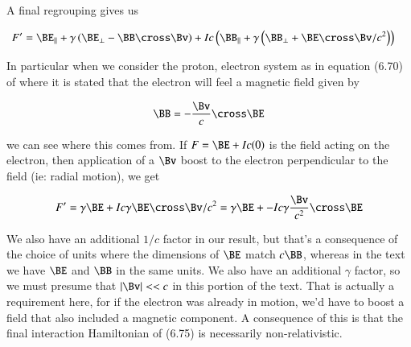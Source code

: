 A final regrouping gives us

\begin{align}\label{eqn:boostCommutator:50}
F'
&=
\BE_\parallel + \gamma \left( \BE_\perp - \BB \cross \Bv \right)
+I c \left( \BB_\parallel + \gamma \left( \BB_\perp + \BE \cross \Bv/c^2 \right) \right)
\end{align}

In particular when we consider the proton, electron system as in equation (6.70) of \cite{desai2009quantum} where it is stated that the electron will feel a magnetic field given by

\begin{align}\label{eqn:boostCommutator:51}
\BB = - \frac{\Bv}{c} \cross \BE
\end{align}

we can see where this comes from.  If $F = \BE + I c (0)$ is the field acting on the electron, then application of a $\Bv$ boost to the electron perpendicular to the field (ie: radial motion), we get

\begin{align}\label{eqn:boostCommutator:52}
F' = \gamma \BE + I c \gamma \BE \cross \Bv/c^2 =
\gamma \BE + -I c \gamma \frac{\Bv}{c^2} \cross \BE
\end{align}

We also have an additional $1/c$ factor in our result, but that's a consequence of the choice of units where the dimensions of $\BE$ match $c \BB$, whereas in the text we have $\BE$ and $\BB$ in the same units.  We also have an additional $\gamma$ factor, so we must presume that $\Abs{\Bv} << c$ in this portion of the text.  That is actually a requirement here, for if the electron was already in motion, we'd have to boost a field that also included a magnetic component.  A consequence of this is that the final interaction Hamiltonian of (6.75) is necessarily non-relativistic.

\EndArticle

